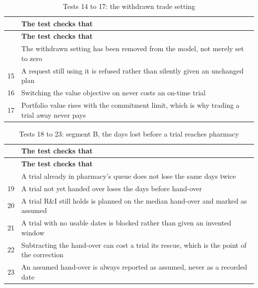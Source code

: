 \begin{longtable}{@{}rp{}@{}}
  \caption{Tests 14 to 17: the withdrawn trade setting}
  \label{tab:tests2}\\
  \toprule
  & \textbf{The test checks that} \\
  \midrule
  \endfirsthead
  \toprule
  & \textbf{The test checks that} \\
  \midrule
  \endhead
  \bottomrule
  \endfoot
  14 & The withdrawn setting has been removed from the model, not merely set to zero \\
  15 & A request still using it is refused rather than silently given an unchanged plan \\
  16 & Switching the value objective on never costs an on-time trial \\
  17 & Portfolio value rises with the commitment limit, which is why trading a trial away never pays \\
\end{longtable}

\begin{longtable}{@{}rp{}@{}}
  \caption{Tests 18 to 23: segment B, the days lost before a trial reaches pharmacy}
  \label{tab:tests3}\\
  \toprule
  & \textbf{The test checks that} \\
  \midrule
  \endfirsthead
  \toprule
  & \textbf{The test checks that} \\
  \midrule
  \endhead
  \bottomrule
  \endfoot
  18 & A trial already in pharmacy's queue does not lose the same days twice \\
  19 & A trial not yet handed over loses the days before hand-over \\
  20 & A trial R\&I still holds is planned on the median hand-over and marked as assumed \\
  21 & A trial with no usable dates is blocked rather than given an invented window \\
  22 & Subtracting the hand-over can cost a trial its rescue, which is the point of the correction \\
  23 & An assumed hand-over is always reported as assumed, never as a recorded date \\
\end{longtable}

